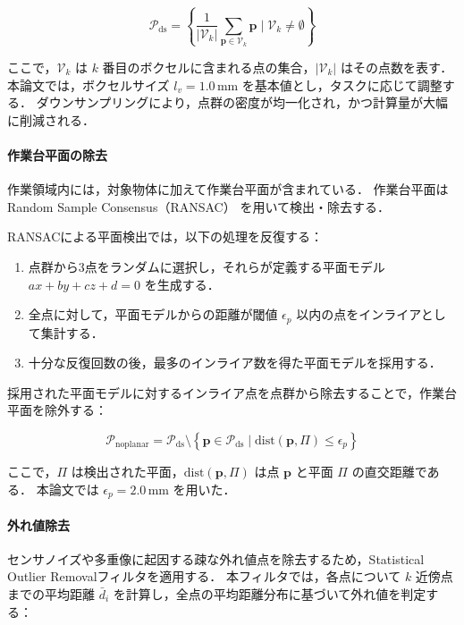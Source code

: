 \begin{equation}
  \mathcal{P}_{\mathrm{ds}} = \left\{ \frac{1}{|\mathcal{V}_k|} \sum_{\bm{p} \in \mathcal{V}_k} \bm{p} \;|\; \mathcal{V}_k \neq \emptyset \right\}
\end{equation}

ここで，$\mathcal{V}_k$ は $k$ 番目のボクセルに含まれる点の集合，$|\mathcal{V}_k|$ はその点数を表す．
本論文では，ボクセルサイズ $l_v = 1.0$\,mm を基本値とし，タスクに応じて調整する．
ダウンサンプリングにより，点群の密度が均一化され，かつ計算量が大幅に削減される．

\paragraph{作業台平面の除去}

作業領域内には，対象物体に加えて作業台平面が含まれている．
作業台平面は Random Sample Consensus（RANSAC）\cite{PCL-RANSAC} を用いて検出・除去する．

RANSACによる平面検出では，以下の処理を反復する：
\begin{enumerate}
  \item 点群から3点をランダムに選択し，それらが定義する平面モデル $ax + by + cz + d = 0$ を生成する．
  \item 全点に対して，平面モデルからの距離が閾値 $\epsilon_p$ 以内の点をインライアとして集計する．
  \item 十分な反復回数の後，最多のインライア数を得た平面モデルを採用する．
\end{enumerate}

採用された平面モデルに対するインライア点を点群から除去することで，作業台平面を除外する：

\begin{equation}
  \mathcal{P}_{\mathrm{noplanar}} = \mathcal{P}_{\mathrm{ds}} \setminus \left\{ \bm{p} \in \mathcal{P}_{\mathrm{ds}} \;|\; \mathrm{dist}(\bm{p}, \Pi) \leq \epsilon_p \right\}
  \label{eq:system:plane_removal}
\end{equation}

ここで，$\Pi$ は検出された平面，$\mathrm{dist}(\bm{p}, \Pi)$ は点 $\bm{p}$ と平面 $\Pi$ の直交距離である．
本論文では $\epsilon_p = 2.0$\,mm を用いた．

\paragraph{外れ値除去}

センサノイズや多重像に起因する疎な外れ値点を除去するため，Statistical Outlier Removalフィルタを適用する．
本フィルタでは，各点について $k$ 近傍点までの平均距離 $\bar{d}_i$ を計算し，全点の平均距離分布に基づいて外れ値を判定する：

